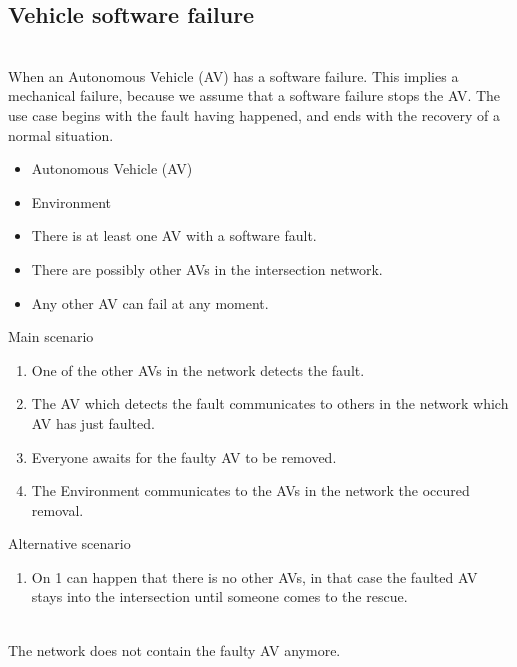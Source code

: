 \documentclass{memoir}
\begin{document}
\subsection{Vehicle software failure}
\begin{description}
	\addtolength{\itemindent}{0.5cm}
	\item[Brief Description] \hfill \\
	When an Autonomous Vehicle (AV) has a software failure. This implies a mechanical failure, because we assume that a software failure stops the AV. The use case begins with the fault having happened, and ends with the recovery of a normal situation.
	
	\item[Actors] \hfill
	\begin{itemize}
		\item Autonomous Vehicle (AV)
		\item Environment
	\end{itemize}
	
	\item[Preconditions] \hfill
	\begin{itemize}
		\item There is at least one AV with a software fault.
		\item There are possibly other AVs in the intersection network.
		\item Any other AV can fail at any moment.
	\end{itemize}
	
	\item[Scenarios] \hfill
	\begin{description}
		\item Main scenario
		\begin{enumerate}
			\item One of the other AVs in the network detects the fault.
			\item The AV which detects the fault communicates to others in the network which AV has just faulted.
			\item Everyone awaits for the faulty AV to be removed.
			\item The Environment communicates to the AVs in the network the occured removal.
		\end{enumerate}
		\item Alternative scenario
		\begin{enumerate}
			\item On 1 can happen that there is no other AVs, in that case the faulted AV stays into the intersection until someone comes to the rescue.
		\end{enumerate}
	\end{description}
	
	\item[Postconditions] \hfill \\
	The network does not contain the faulty AV anymore.
\end{description}
\end{document}
